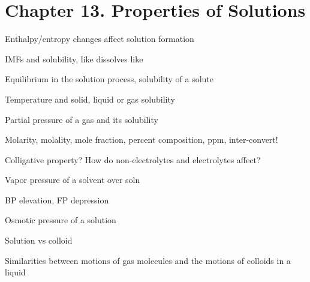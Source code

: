 \section{Chapter 13. Properties of Solutions}


\secttoc

{\footnotesize
\begin{multicols}{3}
\begin{compactenum}
    \item Enthalpy/entropy changes affect solution formation
    \item IMFs and solubility, like dissolves like
    \item Equilibrium in the solution process, solubility of a solute
    \item Temperature and solid, liquid or gas solubility
    \item Partial pressure of a gas and its solubility
    \item Molarity, molality, mole fraction, percent composition, ppm, inter-convert!
    \item Colligative property? How do non-electrolytes and electrolytes affect?
    \item Vapor pressure of a solvent over soln
    \item BP elevation, FP depression
    \item Osmotic pressure of a solution
    \item Solution vs colloid
    \item Similarities between motions of gas molecules and the motions of
        colloids in a liquid
\end{compactenum}
\end{multicols}
}

